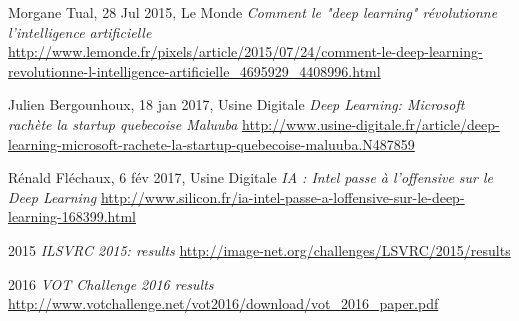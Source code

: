 \begin{thebibliography}{9}

	Morgane Tual,
	28  Jul 2015,
	Le Monde
	\emph{Comment le "deep learning" révolutionne l'intelligence artificielle}
	\url{http://www.lemonde.fr/pixels/article/2015/07/24/comment-le-deep-learning-revolutionne-l-intelligence-artificielle_4695929_4408996.html}

	Julien Bergounhoux,
	18 jan 2017,
	Usine Digitale
	\emph{Deep Learning: Microsoft rachète la startup quebecoise Maluuba}
	\url{http://www.usine-digitale.fr/article/deep-learning-microsoft-rachete-la-startup-quebecoise-maluuba.N487859}

	Rénald Fléchaux,
	6 fév 2017,
	Usine Digitale
	\emph{IA : Intel passe à l’offensive sur le Deep Learning}
	\url{http://www.silicon.fr/ia-intel-passe-a-loffensive-sur-le-deep-learning-168399.html}

	2015
	\emph{ILSVRC 2015: results}
	\url{http://image-net.org/challenges/LSVRC/2015/results}

	2016
	\emph{VOT Challenge 2016 results}
	\url{http://www.votchallenge.net/vot2016/download/vot_2016_paper.pdf}

\end{thebibliography}